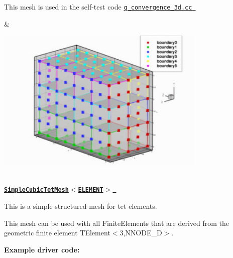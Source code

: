 \begin{center}
\begin{longtabu}
\begin{DoxyItemize}
\item This mesh is used in the self-\/test code \href{../../../../self_test/poisson/convergence_tests/q_convergence_3d.cc}{\tt {\ttfamily q\+\_\+convergence\+\_\+3d.\+cc} }
\end{DoxyItemize}& 
\begin{DoxyImageNoCaption}
  \mbox{\includegraphics[width=0.75\textwidth]{simple_cubic_mesh}}
\end{DoxyImageNoCaption}
   \\
\href{classoomph_1_1SimpleCubicTetMesh.html}{\tt {\bfseries  Simple\+Cubic\+Tet\+Mesh$<$\+E\+L\+E\+M\+E\+N\+T$>$ }} ~\newline
~\newline

\begin{DoxyItemize}
\item This is a simple structured mesh for tet elements.
\item This mesh can be used with all {\ttfamily Finite\+Elements} that are derived from the geometric finite element {\ttfamily T\+Element$<$3,\+N\+N\+O\+D\+E\+\_\+D$>$}.
\end{DoxyItemize}{\bfseries Example driver code\+:} ~\newline


\end{longtabu}
\end{center}
